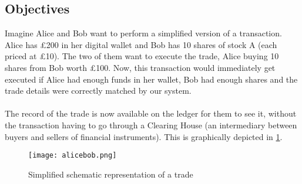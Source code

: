 \documentclass[12pt,twoside]{article}
\begin{document}
\subsection{Objectives}
\label{sub:Objectives}
Imagine Alice and Bob want to perform a simplified version of a transaction. Alice has \pounds 200 in her digital wallet and Bob has 10 shares of stock A (each priced at \pounds 10). The two of them want to execute the trade, Alice buying 10 shares from Bob worth \pounds 100. Now, this transaction would immediately get executed if Alice had enough funds in her wallet, Bob had enough shares and the trade details were correctly matched by our system. 
\\ \\
The record of the trade is now available on the ledger for them to see it, without the transaction having to go through a Clearing House (an intermediary between buyers and sellers of financial instruments). This is graphically depicted in \ref{fig:scheme}. 
\begin{figure}[H]
\centering
\texttt{[image: alicebob.png]}
\caption{Simplified schematic representation of a trade}
\centering
\label{fig:scheme}
\end{figure}
\end{document}
